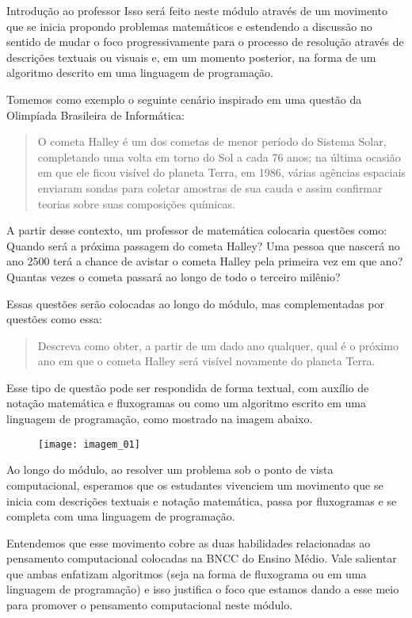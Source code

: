 \begin{apresentacao}{Introdução ao professor}
Isso será feito neste módulo através de um movimento que se inicia propondo problemas matemáticos e estendendo a discussão no sentido de mudar o foco progressivamente para o processo de resolução através de descrições textuais ou visuais e, em um momento posterior, na forma de um algoritmo descrito em uma linguagem de programação.

Tomemos como exemplo o seguinte cenário inspirado em uma questão da Olimpíada Brasileira de Informática:

\begin{quote}
O cometa Halley é um dos cometas de menor período do Sistema Solar, completando uma volta em torno do Sol a cada 76 anos; na última ocasião em que ele ficou visível do planeta Terra, em 1986, várias agências espaciais enviaram sondas para coletar amostras de sua cauda e assim confirmar teorias sobre suas composições químicas.
\end{quote}

A partir desse contexto, um professor de matemática colocaria questões como: Quando será a próxima passagem do cometa Halley? Uma pessoa que nascerá no ano 2500 terá a chance de avistar o cometa Halley pela primeira vez em que ano? Quantas vezes o cometa passará ao longo de todo o terceiro milênio?

Essas questões serão colocadas ao longo do módulo, mas complementadas por questões como essa:

\begin{quote}
Descreva como obter, a partir de um dado ano qualquer, qual é o próximo ano em que o cometa Halley será visível novamente do planeta Terra.
\end{quote}

Esse tipo de questão pode ser respondida de forma textual, com auxílio de notação matemática e fluxogramas ou como um algoritmo escrito em uma linguagem de programação, como mostrado na imagem abaixo.

\begin{figure}[H]
\centering

\texttt{[image: imagem\_01]}
\end{figure}

Ao longo do módulo, ao resolver um problema sob o ponto de vista computacional, esperamos que os estudantes vivenciem um movimento que se inicia com descrições textuais e notação matemática, passa por fluxogramas e se completa com uma linguagem de programação.

Entendemos que esse movimento cobre as duas habilidades relacionadas ao pensamento computacional colocadas na BNCC do Ensino Médio. Vale salientar que ambas enfatizam algoritmos (seja na forma de fluxograma ou em uma linguagem de programação) e isso justifica o foco que estamos dando a esse meio para promover o pensamento computacional neste módulo.


\end{apresentacao}

